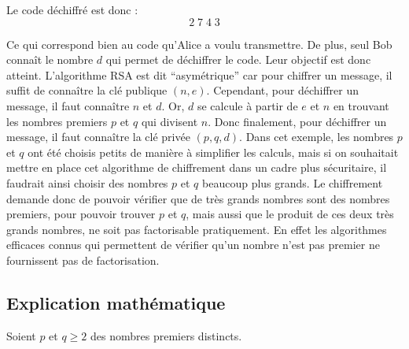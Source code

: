   Le code déchiffré est donc :
  \[2 \; 7 \; 4 \; 3\]

  Ce qui correspond bien au code qu'Alice a voulu transmettre. De plus, seul Bob connaît le nombre $d$ qui permet de déchiffrer le code. Leur objectif est donc atteint.
  \newpar
  L'algorithme RSA est dit ``asymétrique'' car pour chiffrer un message, il suffit de connaître la clé publique $(n, e)$. Cependant, pour déchiffrer un message, il faut connaître $n$ et $d$. Or, $d$ se calcule à partir de $e$ et $n$ en trouvant les nombres premiers $p$ et $q$ qui divisent $n$. Donc finalement, pour déchiffrer un message, il faut connaître la clé privée $(p, q, d)$.
  \newpar
  Dans cet exemple, les nombres $p$ et $q$ ont été choisis petits de manière à simplifier les calculs, mais si on souhaitait mettre en place cet algorithme de chiffrement dans un cadre plus sécuritaire, il faudrait ainsi choisir des nombres $p$ et $q$ beaucoup plus grands.
  \newpar
  Le chiffrement demande donc de pouvoir vérifier que de très grands nombres sont des nombres premiers, pour pouvoir trouver $p$ et $q$, mais aussi que le produit de ces deux très grands nombres, ne soit pas factorisable pratiquement. En effet les algorithmes efficaces connus qui permettent de vérifier qu'un nombre n'est pas premier ne fournissent pas de factorisation.

  \begin{center}
  \end{center}

  \subsection{Explication mathématique}

  Soient $p$ et $q \geq 2$ des nombres premiers distincts.

